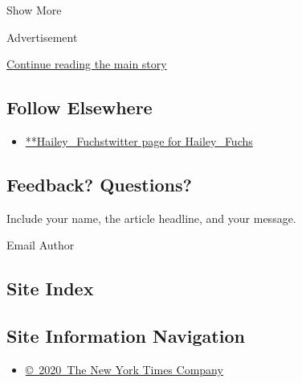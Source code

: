 Show More

Advertisement

\protect\hyperlink{after-mid2}{Continue reading the main story}

\hypertarget{follow-elsewhere}{%
\subsection{Follow Elsewhere}\label{follow-elsewhere}}

\begin{itemize}
\tightlist
\item
  \href{https://twitter.com/Hailey_Fuchs}{**Hailey\_Fuchstwitter page
  for Hailey\_Fuchs}
\end{itemize}

\hypertarget{feedback-questions}{%
\subsection{Feedback? Questions?}\label{feedback-questions}}

Include your name, the article headline, and your message.

Email Author

\hypertarget{site-index}{%
\subsection{Site Index}\label{site-index}}

\hypertarget{site-information-navigation}{%
\subsection{Site Information
Navigation}\label{site-information-navigation}}

\begin{itemize}
\tightlist
\item
  \href{https://help.nytimes3xbfgragh.onion/hc/en-us/articles/115014792127-Copyright-notice}{©~2020~The
  New York Times Company}
\end{itemize}

